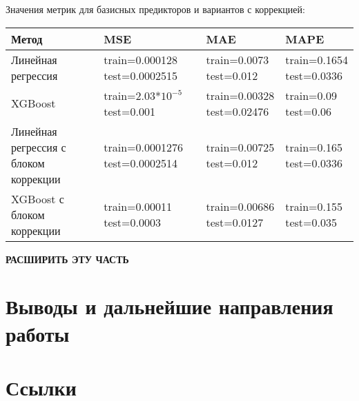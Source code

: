 \documentclass[11pt]{article}
\begin{document}
Значения метрик для базисных предикторов и вариантов с коррекцией:

\begin{tabular}{ |p{3cm}|p{3cm}|p{3cm}|p{3cm}|  }
 \hline
 Метод & MSE &  MAE & MAPE \\
  \hline
 Линейная регрессия &
 \makecell{train=0.000128 \\ test=0.0002515} &
 \makecell{train=0.0073 \\ test=0.012} &
 \makecell{train=0.1654 \\ test=0.0336} \\
 \hline
 XGBoost &
 \makecell{train=2.03*$10^{-5}$ \\ test=0.001} &
 \makecell{train=0.00328 \\ test=0.02476} &
 \makecell{train=0.09 \\ test=0.06} \\
 
 \hline
 Линейная регрессия с блоком коррекции &
 \makecell{train=0.0001276 \\ test=0.0002514} &
 \makecell{train=0.00725 \\ test=0.012} &
 \makecell{train=0.165 \\ test=0.0336} \\
 \hline
 XGBoost с блоком коррекции &
 \makecell{train=0.00011 \\ test=0.0003} &
 \makecell{train=0.00686 \\ test=0.0127} &
 \makecell{train=0.155 \\ test=0.035} \\
 \hline
\end{tabular}

\textbf{РАСШИРИТЬ ЭТУ ЧАСТЬ}

\section*{Выводы и дальнейшие направления работы}

\section*{Ссылки}
\end{document}
